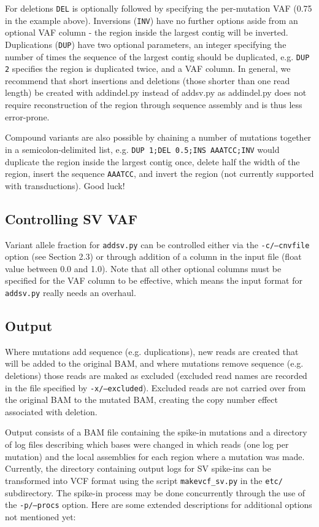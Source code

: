 \documentclass[letterpaper,11pt]{article}
\begin{document}
    For deletions  \texttt{DEL} is optionally followed by specifying the per-mutation VAF (0.75 in the example above). Inversions (\texttt{INV}) have no further options aside from an optional VAF column - the region inside the largest contig will be inverted. Duplications (\texttt{DUP}) have two optional parameters, an integer specifying the number of times the sequence of the largest contig should be duplicated, e.g. \texttt{DUP 2} specifies the region is duplicated twice, and a VAF column. In general, we recommend that short insertions and deletions (those shorter than one read length) be created with addindel.py instead of addsv.py as addindel.py does not require reconstruction of the region through sequence assembly and is thus less error-prone.

    Compound variants are also possible by chaining a number of mutations together in a semicolon-delimited list, e.g. \texttt{DUP 1;DEL 0.5;INS AAATCC;INV} would duplicate the region inside the largest contig once, delete half the width of the region, insert the sequence \texttt{AAATCC}, and invert the region (not currently supported with transductions). Good luck!

\subsection{Controlling SV VAF}
Variant allele fraction for \texttt{addsv.py} can be controlled either via the \texttt{-c/--cnvfile} option (see Section 2.3) or through addition of a column in the input file (float value between 0.0 and 1.0). Note that all other optional columns must be specified for the VAF column to be effective, which means the input format for \texttt{addsv.py} really needs an overhaul.

\subsection{Output}
    Where mutations add sequence (e.g. duplications), new reads are created that will be added to the original BAM, and where mutations remove sequence (e.g. deletions) those reads are maked as excluded (excluded read names are recorded in the file specified by \texttt{-x/--excluded}). Excluded reads are not carried over from the original BAM to the mutated BAM, creating the copy number effect associated with deletion.
    
     Output consists of a BAM file containing the spike-in mutations and a directory of log files describing which bases were changed in which reads (one log per mutation) and the local assemblies for each region where a mutation was made. Currently, the directory containing output logs for SV spike-ins can be transformed into VCF format using the script \texttt {makevcf\_sv.py} in the \texttt {etc/} subdirectory. The spike-in process may be done concurrently through the use of the \texttt {-p/--procs} option. Here are some extended descriptions for additional options not mentioned yet:
     
\end{document}
